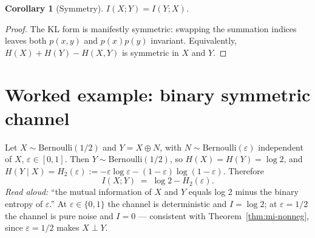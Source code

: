 \documentclass[11pt]{article}
\newtheorem{corollary}{Corollary}
\begin{document}
\begin{corollary}[Symmetry]
$I(X; Y) = I(Y; X)$.
\end{corollary}

\begin{proof}
The KL form is manifestly symmetric: swapping the summation indices leaves both
$p(x, y)$ and $p(x) p(y)$ invariant. Equivalently, $H(X) + H(Y) - H(X, Y)$
is symmetric in $X$ and $Y$.
\end{proof}

\section{Worked example: binary symmetric channel}

Let $X \sim \mathrm{Bernoulli}(1/2)$ and $Y = X \oplus N$, with
$N \sim \mathrm{Bernoulli}(\varepsilon)$ independent of $X$, $\varepsilon \in [0, 1]$.
Then $Y \sim \mathrm{Bernoulli}(1/2)$, so $H(X) = H(Y) = \log 2$, and
$H(Y \mid X) = H_2(\varepsilon) := -\varepsilon \log \varepsilon - (1 - \varepsilon) \log(1 - \varepsilon)$.
Therefore
\[
  I(X; Y) \;=\; \log 2 - H_2(\varepsilon).
\]
\emph{Read aloud:} ``the mutual information of $X$ and $Y$ equals log 2 minus
the binary entropy of $\varepsilon$.''
At $\varepsilon \in \{0, 1\}$ the channel is deterministic and $I = \log 2$;
at $\varepsilon = 1/2$ the channel is pure noise and $I = 0$ — consistent with
Theorem~\ref{thm:mi-nonneg}, since $\varepsilon = 1/2$ makes $X \perp Y$.
\end{document}
